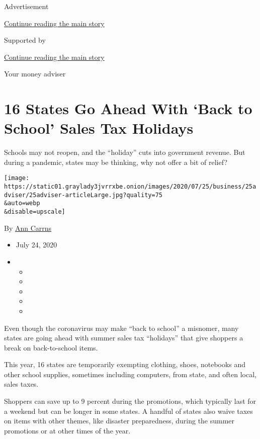 Advertisement

\protect\hyperlink{after-top}{Continue reading the main story}

Supported by

\protect\hyperlink{after-sponsor}{Continue reading the main story}

Your money adviser

\hypertarget{16-states-go-ahead-with-back-to-school-sales-tax-holidays}{%
\section{16 States Go Ahead With `Back to School' Sales Tax
Holidays}\label{16-states-go-ahead-with-back-to-school-sales-tax-holidays}}

Schools may not reopen, and the ``holiday'' cuts into government
revenue. But during a pandemic, states may be thinking, why not offer a
bit of relief?

\texttt{[image: https://static01.graylady3jvrrxbe.onion/images/2020/07/25/business/25adviser/25adviser-articleLarge.jpg?quality=75\\\&auto=webp\\\&disable=upscale]}

By \href{https://www.nytimes3xbfgragh.onion/by/ann-carrns}{Ann Carrns}

\begin{itemize}
\item
  July 24, 2020
\item
  \begin{itemize}
  \item
  \item
  \item
  \item
  \item
  \end{itemize}
\end{itemize}

Even though the coronavirus may make ``back to school'' a misnomer, many
states are going ahead with summer sales tax ``holidays'' that give
shoppers a break on back-to-school items.

This year, 16 states are temporarily exempting clothing, shoes,
notebooks and other school supplies, sometimes including computers, from
state, and often local, sales taxes.

Shoppers can save up to 9 percent during the promotions, which typically
last for a weekend but can be longer in some states. A handful of states
also waive taxes on items with other themes, like disaster preparedness,
during the summer promotions or at other times of the year.

